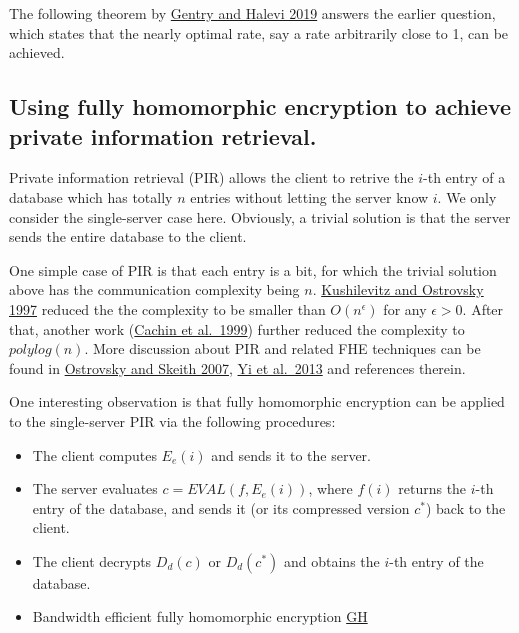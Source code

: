 The following theorem by
\href{https://eprint.iacr.org/2019/733.pdf}{Gentry and Halevi 2019}
answers the earlier question, which states that the nearly optimal rate,
say a rate arbitrarily close to 1, can be achieved.

\hypertarget{optrate}{}

\subsection{Using fully homomorphic encryption to achieve private
information retrieval.}\label{15-Using-fully-homomorphi}

Private information retrieval (PIR) allows the client to retrive the
\(i\)-th entry of a database which has totally \(n\) entries without
letting the server know \(i\). We only consider the single-server case
here. Obviously, a trivial solution is that the server sends the entire
database to the client.

One simple case of PIR is that each entry is a bit, for which the
trivial solution above has the communication complexity being \(n\).
\href{https://web.cs.ucla.edu/~rafail/PUBLIC/34.pdf}{Kushilevitz and
Ostrovsky 1997} reduced the the complexity to be smaller than
\(O(n^\epsilon)\) for any \(\epsilon>0\). After that, another work
(\href{https://people.csail.mit.edu/silvio/Selected\%20Scientific\%20Papers/Private\%20Information\%20Retrieval/Computationally\%20Private\%20Information\%20Retrieval\%20with\%20Polylogarithmic\%20Communication.pdf}{Cachin
et al.~1999}) further reduced the complexity to \(polylog(n)\). More
discussion about PIR and related FHE techniques can be found in
\href{https://eprint.iacr.org/2007/059.pdf}{Ostrovsky and Skeith 2007},
\href{https://ieeexplore.ieee.org/document/6189348}{Yi et al.~2013} and
references therein.

One interesting observation is that fully homomorphic encryption can be
applied to the single-server PIR via the following procedures:

\begin{itemize}
\item
  The client computes \(E_e(i)\) and sends it to the server.
\item
  The server evaluates \(c=\ensuremath{\mathit{EVAL}}(f,E_e(i))\), where
  \(f(i)\) returns the \(i\)-th entry of the database, and sends it (or
  its compressed version \(c^*\)) back to the client.
\item
  The client decrypts \(D_d(c)\) or \(D_d(c^*)\) and obtains the
  \(i\)-th entry of the database.
\item
  Bandwidth efficient fully homomorphic encryption
  \href{https://eprint.iacr.org/2019/733.pdf}{GH}
\end{itemize}


